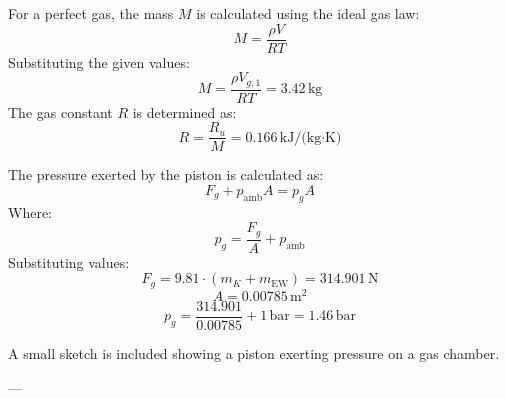For a perfect gas, the mass \( M \) is calculated using the ideal gas law:  
\[
M = \frac{\rho V}{RT}
\]  
Substituting the given values:  
\[
M = \frac{\rho V_{g,1}}{RT} = 3.42 \, \text{kg}
\]  
The gas constant \( R \) is determined as:  
\[
R = \frac{R_u}{M} = 0.166 \, \text{kJ/(kg·K)}
\]  

The pressure exerted by the piston is calculated as:  
\[
F_g + p_{\text{amb}} A = p_g A
\]  
Where:  
\[
p_g = \frac{F_g}{A} + p_{\text{amb}}
\]  
Substituting values:  
\[
F_g = 9.81 \cdot (m_K + m_{\text{EW}}) = 314.901 \, \text{N}
\]  
\[
A = 0.00785 \, \text{m}^2
\]  
\[
p_g = \frac{314.901}{0.00785} + 1 \, \text{bar} = 1.46 \, \text{bar}
\]  

A small sketch is included showing a piston exerting pressure on a gas chamber.  

---